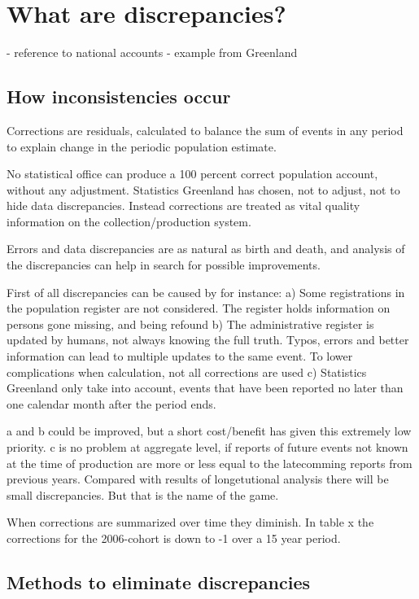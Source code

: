 \documentclass[USenglish]{article}
\begin{document}
\section{What are discrepancies?}

- reference to national accounts
- example from Greenland



\subsection{How inconsistencies occur}

Corrections are residuals, calculated to balance the sum of events in any period to explain change in the periodic population estimate.

No statistical office can produce a 100 percent correct population account, without any adjustment. Statistics Greenland has chosen, not to adjust, not to hide data discrepancies. Instead corrections are treated as vital quality information on the collection/production system.

Errors and data discrepancies are as natural as birth and death, and analysis of the discrepancies can help in search for possible improvements.

First of all discrepancies can be caused by for instance: a) Some registrations in the population register are not considered. The register holds information on persons gone missing, and being refound b) The administrative register is updated by humans, not always knowing the full truth. Typos, errors and better information can lead to multiple updates to the same event. To lower complications when calculation, not all corrections are used c) Statistics Greenland only take into account, events that have been reported no later than one calendar month after the period ends.

a and b could be improved, but a short cost/benefit has given this extremely low priority. c is no problem at aggregate level, if reports of future events not known at the time of production are more or less equal to the latecomming reports from previous years. Compared with results of longetutional analysis there will be small discrepancies. But that is the name of the game.

When corrections are summarized over time they diminish. In table x the corrections for the 2006-cohort is down to -1 over a 15 year period. 

\subsection{Methods to eliminate discrepancies}
\end{document}
